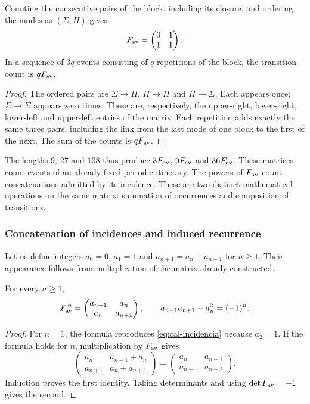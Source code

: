 \begin{proposicion}
\label{prop:cal-incidencia}
Counting the consecutive pairs of the block, including its closure, and ordering
the modes as $(\Sigma,\Pi)$ gives
\begin{equation}
 F_{\rm av}=\begin{pmatrix}0&1\\1&1\end{pmatrix}.
 \label{eq:cal-incidencia}
\end{equation}
In a sequence of $3q$ events consisting of $q$ repetitions of the block,
the transition count is $qF_{\rm av}$.
\end{proposicion}
\begin{proof}
The ordered pairs are $\Sigma\to\Pi$, $\Pi\to\Pi$ and
$\Pi\to\Sigma$. Each appears once; $\Sigma\to\Sigma$
appears zero times. These are, respectively, the upper-right,
lower-right, lower-left and upper-left entries of the
matrix. Each repetition adds exactly the same three pairs, including
the link from the last mode of one block to the first of the next.
The sum of the counts is $qF_{\rm av}$.
\end{proof}

The lengths $9$, $27$ and $108$ thus produce $3F_{\rm av}$,
$9F_{\rm av}$ and $36F_{\rm av}$. These matrices count events of an
already fixed periodic itinerary. The powers of $F_{\rm av}$ count
concatenations admitted by its incidence. These are two distinct
mathematical operations on the same matrix: summation of occurrences and
composition of transitions.

\subsubsection{Concatenation of incidences and induced recurrence}

Let us define integers $a_0=0$, $a_1=1$ and
$a_{n+1}=a_n+a_{n-1}$ for $n\geq1$. Their appearance follows from
multiplication of the matrix already constructed.

\begin{proposicion}
\label{prop:cal-potencias}
For every $n\geq1$,
\[
 F_{\rm av}^{\,n}=
 \begin{pmatrix}a_{n-1}&a_n\\a_n&a_{n+1}\end{pmatrix},
 \qquad
 a_{n-1}a_{n+1}-a_n^2=(-1)^n.
\]
\end{proposicion}
\begin{proof}
For $n=1$, the formula reproduces \eqref{eq:cal-incidencia} because
$a_2=1$. If the formula holds for $n$, multiplication by $F_{\rm av}$
gives
\[
 \begin{pmatrix}
 a_n&a_{n-1}+a_n\\a_{n+1}&a_n+a_{n+1}
 \end{pmatrix}
 =\begin{pmatrix}a_n&a_{n+1}\\a_{n+1}&a_{n+2}\end{pmatrix}.
\]
Induction proves the first identity. Taking determinants and using
$\det F_{\rm av}=-1$ gives the second.
\end{proof}


